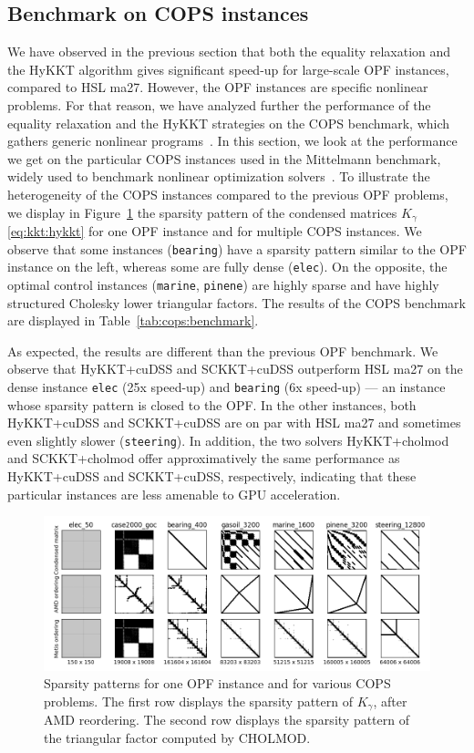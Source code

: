 \subsection{Benchmark on COPS instances}
We have observed in the previous section that both the equality relaxation
and the HyKKT algorithm gives significant speed-up for large-scale
OPF instances, compared to HSL ma27.
However, the OPF instances are specific nonlinear problems.
For that reason, we have analyzed further the performance of
the equality relaxation and the HyKKT strategies on the COPS benchmark,
which gathers generic nonlinear programs~\cite{dolan2004benchmarking}.
In this section, we look at the performance we get on the particular COPS instances used in
the Mittelmann benchmark, widely used to benchmark nonlinear optimization
solvers~\cite{mittelmann2002benchmark}.
To illustrate the heterogeneity of the COPS instances compared to the
previous OPF problems, we display in Figure~\ref{fig:cops:nnz} the sparsity pattern of the
condensed matrices $K_\gamma$ \eqref{eq:kkt:hykkt} for one OPF instance and for multiple
COPS instances. We observe that some instances ({\tt bearing}) have a sparsity pattern
similar to the OPF instance on the left, whereas some are fully dense ({\tt elec}).
On the opposite, the optimal control instances ({\tt marine}, {\tt pinene}) are
highly sparse and have highly structured Cholesky lower triangular factors.
The results of the COPS benchmark are displayed in Table~\ref{tab:cops:benchmark}.

As expected, the results are different than the previous OPF benchmark.
We observe that HyKKT+cuDSS and SCKKT+cuDSS outperform HSL ma27 on the dense instance {\tt elec}
(25x speed-up) and {\tt bearing} (6x speed-up) --- an instance whose sparsity pattern
is closed to the OPF. In the other instances, both HyKKT+cuDSS and SCKKT+cuDSS are
on par with HSL ma27 and sometimes even slightly slower ({\tt steering}).
In addition, the two solvers HyKKT+cholmod and SCKKT+cholmod offer approximatively
the same performance as HyKKT+cuDSS and SCKKT+cuDSS, respectively, indicating that these
particular instances are less amenable to GPU acceleration.

\begin{figure}[!ht]
  \centering
  \includegraphics[width=.9\textwidth]{../figures/sparsity_pattern.png}
  \caption{Sparsity patterns for one OPF instance and for various
    COPS problems. The first row displays the sparsity pattern
    of $K_\gamma$, after AMD reordering. The second row displays
    the sparsity pattern of the triangular factor computed by CHOLMOD.
    \label{fig:cops:nnz}
  }
\end{figure}



